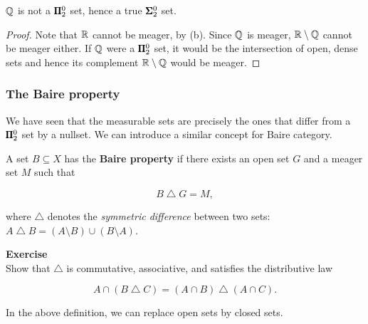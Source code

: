 \begin{corollary}\label{cor-rationals-not-pi2}$\mathbb{Q}$ is not a $\pmb{\Pi}^0_2$ set, hence a true $\pmb{\Sigma}^0_2$ set.

\end{corollary}\begin{proof}Note that $\mathbb{R}$ cannot be meager, by (b). Since $\mathbb{Q}$ is meager, $\mathbb{R} \setminus \mathbb{Q}$ cannot be meager either.
If $\mathbb{Q}$ were a $\pmb{\Pi}^0_2$ set, it would be the intersection of open, dense sets and hence its complement $\mathbb{R} \setminus \mathbb{Q}$ would be meager.

\end{proof}\subsubsection{The Baire property}

We have seen that the measurable sets are precisely the ones that differ from a $\pmb{\Pi}^0_2$ set by a nullset.
We can introduce a similar concept for Baire category.

\begin{definition}\label{def-bp}A set $B \subseteq X$ has the \textbf{Baire property} if there exists an open set $G$ and a meager set $M$ such that

\begin{equation}
B \bigtriangleup G = M,
\end{equation}

where $\bigtriangleup$ denotes the \textit{symmetric difference} between two sets: $A \bigtriangleup B = (A\setminus B) \cup (B \setminus A)$.

\end{definition}\begin{framed}
\textbf{Exercise}\\
Show that $\bigtriangleup$ is commutative, associative, and satisfies the distributive law

\begin{equation}
A \cap (B \bigtriangleup C) = (A \cap B) \bigtriangleup (A \cap C).
\end{equation}
\end{framed}

In the above definition, we can replace open sets by closed sets.

